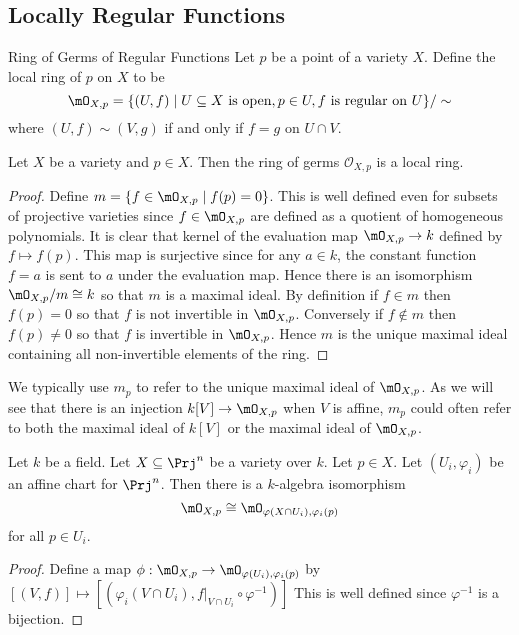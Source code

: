 \documentclass[a4paper]{article}
\begin{document}
\subsection{Locally Regular Functions}
\begin{defn}{Ring of Germs of Regular Functions}{} Let $p$ be a point of a variety $X$. Define the local ring of $p$ on $X$ to be $$\mO_{X,p}=\{(U,f)\;|\;U\subseteq X\text{ is open}, p\in U, f\text{ is regular on }U\}/\sim$$ where $(U,f)\sim(V,g)$ if and only if $f=g$ on $U\cap V$. 
\end{defn}

\begin{prp}{}{} Let $X$ be a variety and $p\in X$. Then the ring of germs $\mathcal{O}_{X,p}$ is a local ring. 
\begin{proof}
Define $m=\{f\in\mO_{X,p}\;|\;f(p)=0\}$. This is well defined even for subsets of projective varieties since $f\in\mO_{X,p}$ are defined as a quotient of homogeneous polynomials. It is clear that kernel of the evaluation map $\mO_{X,p}\to k$ defined by $f\mapsto f(p)$. This map is surjective since for any $a\in k$, the constant function $f=a$ is sent to $a$ under the evaluation map. Hence there is an isomorphism $\mO_{X,p}/m\cong k$ so that $m$ is a maximal ideal. By definition if $f\in m$ then $f(p)=0$ so that $f$ is not invertible in $\mO_{X,p}$. Conversely if $f\notin m$ then $f(p)\neq 0$ so that $f$ is invertible in $\mO_{X,p}$. Hence $m$ is the unique maximal ideal containing all non-invertible elements of the ring. 
\end{proof}
\end{prp}

We typically use $m_p$ to refer to the unique maximal ideal of $\mO_{X,p}$. As we will see that there is an injection $k[V]\to\mO_{X,p}$ when $V$ is affine, $m_p$ could often refer to both the maximal ideal of $k[V]$ or the maximal ideal of $\mO_{X,p}$. 

\begin{prp}{}{} Let $k$ be a field. Let $X\subseteq\Prj^n$ be a variety over $k$. Let $p\in X$. Let $(U_i,\varphi_i)$ be an affine chart for $\Prj^n$. Then there is a $k$-algebra isomorphism $$\mO_{X,p}\cong\mO_{\varphi(X\cap U_i),\varphi_i(p)}$$ for all $p\in U_i$. 
\begin{proof}
Define a map $\phi:\mO_{X,p}\to\mO_{\varphi(U_i),\varphi_i(p)}$ by $[(V,f)]\mapsto[(\varphi_i(V\cap U_i),f|_{V\cap U_i}\circ\varphi^{-1})]$ This is well defined since $\varphi^{-1}$ is a bijection. 
\end{proof}
\end{prp}
\end{document}
